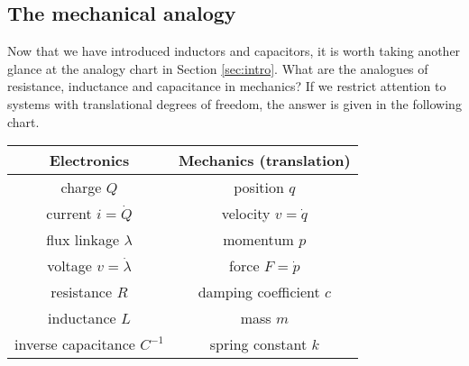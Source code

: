 \subsection{The mechanical analogy} \label{sec:mechanical}

Now that we have introduced inductors and capacitors, it is worth taking 
another glance at the analogy chart in Section \ref{sec:intro}.  What are the
analogues of resistance, inductance and capacitance in mechanics?  If we restrict attention to systems with translational degrees of freedom, the answer is given in the following
chart.

\begin{small}
\begin{center}
\begin{tabular}{|c|c|}
\hline
Electronics & Mechanics (translation) \\
\hline\hline
charge $Q$ & position $q$ \\
\hline
current $i = \dot Q$ & velocity $v = \dot q$ \\
\hline
flux linkage $\lambda$ & momentum $p$ \\
\hline
voltage $v = \dot \lambda$ & force $F = \dot p$ \\
\hline
resistance $R$ & damping coefficient $c$ \\
\hline
inductance $L$ & mass $m$ \\
\hline
inverse capacitance $C^{-1}$ & spring constant $k$ \\
\hline
\end{tabular}
\end{center}
\end{small}

